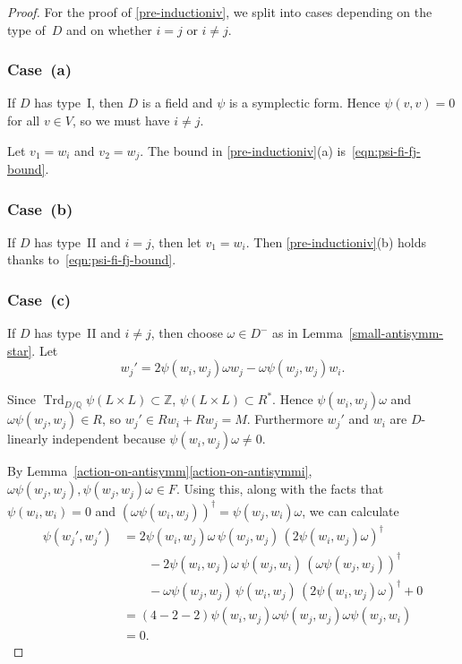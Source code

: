 \documentclass[JEP,XML,SOM,Unicode,NoFloatCountersInSection]{cedram}
\newcommand{\bQ}{\mathbb{Q}}
\newcommand{\bZ}{\mathbb{Z}}
\DeclareMathOperator{\Trd}{Trd}
\begin{document}
\begin{proof}
For the proof of \eqref{pre-inductioniv}, we split into cases depending on the type of~$D$ and on whether $i=j$ or $i \neq j$.

\subsubsection*{Case~(a)}

If $D$ has type~I, then $D$ is a field and $\psi$ is a symplectic form.
Hence $\psi(v,v) = 0$ for all $v \in V$, so we must have $i \neq j$.

Let $v_1 = w_i$ and $v_2 = w_j$.
The bound in \eqref{pre-inductioniv}(a) is~\eqref{eqn:psi-fi-fj-bound}.

\subsubsection*{Case~(b)}

If $D$ has type~II and $i=j$, then let $v_1 = w_i$.
Then \eqref{pre-inductioniv}(b) holds thanks to~\eqref{eqn:psi-fi-fj-bound}.

\subsubsection*{Case~(c)}
If $D$ has type~II and $i \neq j$, then choose $\omega \in D^-$ as in Lemma~\ref{small-antisymm-star}.
Let\vspace*{-3pt}
\[
w_j' = 2\psi(w_i, w_j)\omega w_j - \omega\psi(w_j, w_j) w_i.
\]

\pagebreak[2]
\noindent
Since $\Trd_{D/\bQ} \psi(L \times L) \subset \bZ$, $\psi(L \times L) \subset R^*$.
Hence $\psi(w_i, w_j)\omega$ and $\omega\psi(w_j, w_j) \in R$, so $w_j' \in Rw_i + Rw_j = M$.
Furthermore $w_j'$ and $w_i$ are $D$-linearly independent because $\psi(w_i, w_j)\omega \neq 0$.

By Lemma~\ref{action-on-antisymm}\eqref{action-on-antisymmi}, $\omega\psi(w_j, w_j), \psi(w_j, w_j)\omega \in F$.
Using this, along with the facts that $\psi(w_i,w_i) = 0$ and $(\omega \psi(w_i, w_j))^\dag = \psi(w_j, w_i) \omega$, we can calculate
\begin{align*}
\psi(w_j', w_j')
& = 2\psi(w_i, w_j) \omega \, \psi(w_j, w_j) \, (2\psi(w_i, w_j) \omega)^\dag
\\& \qquad - 2\psi(w_i, w_j) \omega \, \psi(w_j, w_i) \, (\omega \psi(w_j, w_j))^\dag
\\& \qquad - \omega \psi(w_j, w_j) \, \psi(w_i, w_j) \, (2\psi(w_i, w_j) \omega)^\dag
+ 0
\\& = (4-2-2) \psi(w_i, w_j) \omega \psi(w_j, w_j) \omega \psi(w_j, w_i)
\\& = 0.
\end{align*}


\end{proof}
\end{document}
